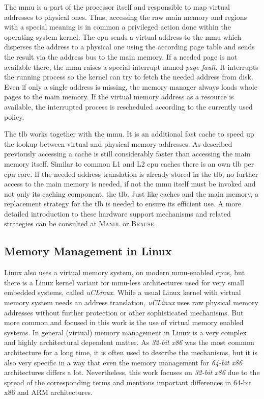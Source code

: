 The \ac{mmu} is a part of the processor itself and responsible to map virtual addresses to physical ones. 
Thus, accessing the raw main memory and regions with a special meaning is in common a privileged action done within the operating system kernel. 
The \ac{cpu} sends a virtual address to the \ac{mmu} which disperses the address to a physical one using the according page table and sends the result via the address bus to the main memory.
If a needed page is not available there, the \ac{mmu} raises a special interrupt named \textit{page fault}.
It interrupts the running process so the kernel can try to fetch the needed address from disk.
Even if only a single address is missing, the memory manager always loads whole pages to the main memory.
If the virtual memory address as a resource is available, the interrupted process is rescheduled according to the currently used policy\cite{mandl2014Grundkurs}.

The \ac{tlb} works together with the \ac{mmu}.
It is an additional fast cache to speed up the lookup between virtual and physical memory addresses. 
As described previously accessing a cache is still considerably faster than accessing the main memory itself.
Similar to common L1 and L2 \ac{cpu} caches there is an own \ac{tlb} per \ac{cpu} core.
If the needed address translation is already stored in the \ac{tlb}, no further access to the main memory is needed, if not the \ac{mmu} itself must be invoked and not only its caching component, the \ac{tlb}.
Just like caches and the main memory, a replacement strategy for the \ac{tlb} is needed to ensure its efficient use.
A more detailed introduction to these hardware support mechanisms and related strategies can be consulted at \textsc{Mandl}\cite{mandl2014Grundkurs} or \textsc{Brause}\cite{brause2017betriebssysteme}.

 
\subsection{Memory Management in Linux}\label{sec:mm:linux}
Linux also uses a virtual memory system, on modern \ac{mmu}-enabled \acp{cpu}, but there is a Linux kernel variant for \ac{mmu}-less architectures used for very small embedded systems, called \textit{uCLinux}.
While a usual Linux kernel with virtual memory system needs an address translation, \textit{uCLinux} uses raw physical memory addresses without further protection or other sophisticated mechanisms.
But more common and focused in this work is the use of virtual memory enabled systems\cite{lfd430}.
In general (virtual) memory management in Linux is a very complex and highly architectural dependent matter.
As \textit{32-bit x86} was the most common architecture for a long time, it is often used to describe the mechanisms, but it is also very specific in a way that even the memory management for \textit{64-bit x86} architectures differs a lot.
Nevertheless, this work focuses on \textit{32-bit x86} due to the spread of the corresponding terms and mentions important differences in 64-bit x86 and ARM architectures.

